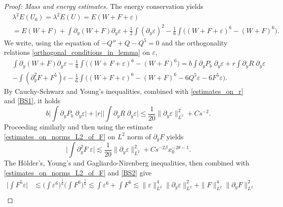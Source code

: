\documentclass[16pt,english, oneside,reqno]{smfart}
\newcommand{\vare}{{\varepsilon}}
\begin{document}
\begin{proof}[Proof: Mass and energy estimates]
\vspace{0.4cm}
The energy conservation yields
\begin{equation}
\begin{split}
    & \lambda^2 E(U_0) =\lambda^2 E(U)= E(W+F+\vare)\\ 
    & =E(W+F) + \int \partial_y(W+F)\partial_y \vare +\frac{1}{2}\int (\partial_y \vare)^2 -\frac{1}{6}\int \big( (W+F+\vare)^6-(W+F)^6 \big).
\end{split}
\end{equation}
We write, using the equation of $-Q''+Q-Q^5 = 0$ and the orthogonality relations \eqref{orthogonal_conditions_in_lemma} on $\vare$,
\begin{equation}\label{proof_of_L2_grad_epsilon_rewriting1}
\begin{split}
    & \int \partial_y (W+F)\partial_y\vare -\frac{1}{6}\int \big((W+F+\vare)^6 - (W+F)^6\big)= b\int \partial_y P_b \; \partial_y \vare + r \int \partial_y R \; \partial_y \vare\\
    &  - \int (\partial^2_y F + F^5 )\vare - \frac{1}{6}\int \Big((W+F+\vare)^6-(W+F)^6- 6Q^5\vare - 6F^5\vare \Big).
\end{split}
\end{equation}
By Cauchy-Schwarz and Young's inequalities, combined with \eqref{estimates_on_r} and \eqref{BS1}, it holds
\begin{equation}
    b \Big\lvert\int\partial_y P_b\; \partial_y \vare \Big\rvert + |r| \Big\lvert\int \partial_y R \; \partial_y \vare \Big\rvert \leq \frac{1}{20}\|\partial_y \vare\|^2_{L^2} + Cs^{-2}.
\end{equation}
Proceeding similarly and then using the estimate \eqref{estimates_on_norms_L2_of_F} on $L^2$ norm of $\partial_yF$ yields
\begin{equation}
    \Big\lvert \int \partial^2_y F \; \vare \Big\lvert \lesssim \frac{1}{20}\|\partial_y \vare\|^2_{L^2} + C s^{-2\beta}x^{-2\theta-1}_0.
\end{equation}
The Hölder's, Young's and Gagliardo-Nirenberg inequalities, then combined with \eqref{estimates_on_norms_L2_of_F} and \eqref{BS2} give
\begin{equation}
\begin{split}
    \Big\lvert \int F^5 \vare \Big\rvert 
    & \lesssim \Big( \int \vare^6\Big)^{\frac{1}{6}}\Big(\int F^6\Big)^{\frac{1}{6}} \lesssim \int \vare^6 +\int F^6 
    \lesssim \|\vare\|^4_{L^2}\|\partial_y\vare\|^2_{L^2} + \|F\|^4_{L^2}\| \partial_y F\|^2_{L^2} \\

\end{split}
\end{equation}
\end{proof}
\end{document}
